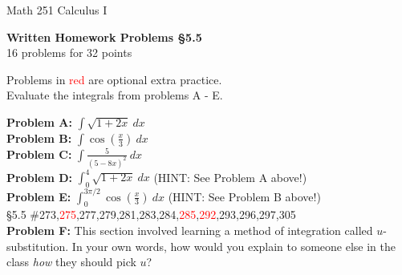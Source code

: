 \documentclass[11pt]{report}
\theoremstyle{plain}
\newcommand{\opt}[1]{\textcolor{red}{#1}}
\begin{document}
\hfill Math 251 Calculus I
\begin{center}
\Large{\textbf{Written Homework Problems \S 5.5}} \\
16 problems for 32 points\\
\end{center}

Problems in \textcolor{red}{red} are optional extra practice.\\

Evaluate the integrals from problems A - E.
	
\textbf{Problem A:} $\displaystyle \int \sqrt{1+2x} \: dx $\\

\textbf{Problem B:} $\displaystyle \int \cos\left( \frac{x}{3} \right) \: dx$\\

\textbf{Problem C:} $\displaystyle \int \frac{5}{(5-8x)^2} \: dx$\\

\textbf{Problem D:} $\displaystyle \int_0^4  \sqrt{1+2x} \: dx $ (HINT: See Problem A above!)\\

\textbf{Problem E:} $\displaystyle \int_0^{3 \pi /2} \cos\left( \frac{x}{3} \right) \: dx$ (HINT: See Problem B above!)\\
	
{\S 5.5} \#273,\opt{275},277,279,281,283,284,\opt{285},\opt{292},293,296,297,305\\


\textbf{Problem F:} This section involved learning a method of integration called $u$-substitution. In your own words, how would you explain to someone else in the class \emph{how} they should pick $u$? 
\end{document}
